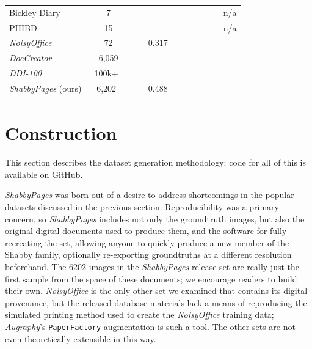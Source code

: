 \documentclass[runningheads]{llncs}
\newcommand{\cmark}{{\color{ForestGreen}\ding{51}}}%
\newcommand{\xmark}{{\color{Maroon}\ding{55}}}%
\begin{document}
\begin{table}[]
\begin{tabular}{lcllllllll}
         Bickley Diary \cite{bickley-diary} & 7 & \xmark & \cmark &  & \xmark & \xmark & \xmark & \xmark & n/a\\
         PHIBD \cite{nafchi-2013-icdar} & 15 & \xmark & \cmark &  & \cmark & \cmark & \xmark & \xmark & n/a\\
         \midrule
         \emph{NoisyOffice} \cite{ref_NoisyOffice} & 72  & \cmark & \cmark & 0.317 & \cmark & \xmark & \xmark & \xmark & \xmark \\
         \emph{DocCreator} \cite{ref_DocCreator} & 6,059 & \cmark & \cmark & & \cmark & \cmark & \cmark & \xmark &\cmark\\
         \emph{DDI-100} \cite{ddi-100-2019} & 100k+~ & \cmark & \cmark & & & & & & \xmark\\
         \emph{ShabbyPages} (ours)~ & 6,202~ & \cmark & \cmark & 0.488~ & \cmark~ & \cmark~ & \cmark & \cmark & \cmark \\
         \bottomrule
    \end{tabular}
\end{table}

\section{Construction}
This section describes the dataset generation methodology; code for all of this is available on GitHub.

\emph{ShabbyPages} was born out of a desire to address shortcomings in the popular datasets discussed in the previous section.
Reproducibility was a primary concern, so \emph{ShabbyPages} includes not only the groundtruth images, but also the original digital documents used to produce them, and the software for fully recreating the set, allowing anyone to quickly produce a new member of the Shabby family, optionally re-exporting groundtruths at a different resolution beforehand.
The 6202 images in the \emph{ShabbyPages} release set are really just the first sample from the space of these documents; we encourage readers to build their own.
\emph{NoisyOffice} is the only other set we examined that contains its digital provenance, but the released database materials lack a means of reproducing the simulated printing method used to create the \emph{NoisyOffice} training data; \emph{Augraphy}'s \texttt{PaperFactory} augmentation is such a tool.
The other sets are not even theoretically extensible in this way.
\end{document}
